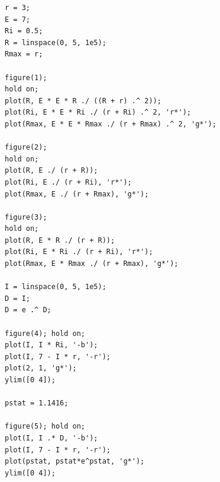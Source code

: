 \newpage
\begin{lstlisting}
r = 3;
E = 7;
Ri = 0.5;
R = linspace(0, 5, 1e5);
Rmax = r;

figure(1);
hold on;
plot(R, E * E * R ./ ((R + r) .^ 2));
plot(Ri, E * E * Ri ./ (r + Ri) .^ 2, 'r*');
plot(Rmax, E * E * Rmax ./ (r + Rmax) .^ 2, 'g*');

figure(2);
hold on;
plot(R, E ./ (r + R));
plot(Ri, E ./ (r + Ri), 'r*');
plot(Rmax, E ./ (r + Rmax), 'g*');

figure(3);
hold on;
plot(R, E * R ./ (r + R));
plot(Ri, E * Ri ./ (r + Ri), 'r*');
plot(Rmax, E * Rmax ./ (r + Rmax), 'g*');

I = linspace(0, 5, 1e5);
D = I;
D = e .^ D;

figure(4); hold on;
plot(I, I * Ri, '-b');
plot(I, 7 - I * r, '-r');
plot(2, 1, 'g*');
ylim([0 4]);

pstat = 1.1416;

figure(5); hold on;
plot(I, I .* D, '-b');
plot(I, 7 - I * r, '-r');
plot(pstat, pstat*e^pstat, 'g*');
ylim([0 4]);
\end{lstlisting}
